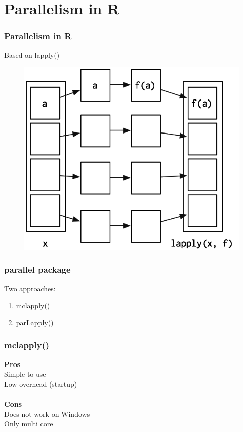 \documentclass{beamer}
\begin{document}
\section{Parallelism in R}

\begin{frame}
	\frametitle{Parallelism in R}
	Based on lapply()
	\begin{figure}[t]
		\begin{center}
			\includegraphics[scale=0.8]{figures/lapply}	\\
		\end{center}
	\end{figure}
\end{frame}

\begin{frame}
	\frametitle{parallel package}
	Two approaches:
	\begin{center}
		\begin{enumerate}
			\item mclapply()
			\item parLapply()
		\end{enumerate}
	\end{center}
\end{frame}

\begin{frame}
	\frametitle{mclapply()}
	\begin{center}
		\textbf{Pros} \\
		Simple to use \\
		Low overhead (startup) \\~\\
		
		\textbf{Cons} \\
		Does not work on Windows \\
		Only multi core \\
	\end{center}
\end{frame}
\end{document}
